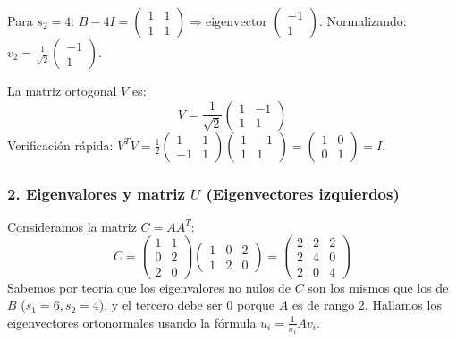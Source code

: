 \documentclass[12pt]{article}
\begin{document}
Para $s_2 = 4$:
$B - 4I = \begin{pmatrix} 1 & 1 \\ 1 & 1 \end{pmatrix} \Rightarrow \text{eigenvector } \begin{pmatrix} -1 \\ 1 \end{pmatrix}$. Normalizando: $v_2 = \frac{1}{\sqrt{2}}\begin{pmatrix} -1 \\ 1 \end{pmatrix}$.

La matriz ortogonal $V$ es:
\begin{equation}
    V = \frac{1}{\sqrt{2}} \begin{pmatrix} 1 & -1 \\ 1 & 1 \end{pmatrix}
\end{equation}
Verificación rápida: $V^T V = \frac{1}{2} \begin{pmatrix} 1 & 1 \\ -1 & 1 \end{pmatrix} \begin{pmatrix} 1 & -1 \\ 1 & 1 \end{pmatrix} = \begin{pmatrix} 1 & 0 \\ 0 & 1 \end{pmatrix} = I$.

\subsubsection*{2. Eigenvalores y matriz $U$ (Eigenvectores izquierdos)}
Consideramos la matriz $C = A A^T$:
\begin{equation}
    C = \begin{pmatrix} 1 & 1 \\ 0 & 2 \\ 2 & 0 \end{pmatrix} \begin{pmatrix} 1 & 0 & 2 \\ 1 & 2 & 0 \end{pmatrix} = \begin{pmatrix} 2 & 2 & 2 \\ 2 & 4 & 0 \\ 2 & 0 & 4 \end{pmatrix}
\end{equation}
Sabemos por teoría que los eigenvalores no nulos de $C$ son los mismos que los de $B$ ($s_1=6, s_2=4$), y el tercero debe ser $0$ porque $A$ es de rango 2.
Hallamos los eigenvectores ortonormales usando la fórmula $u_i = \frac{1}{\sigma_i} A v_i$.
\end{document}
